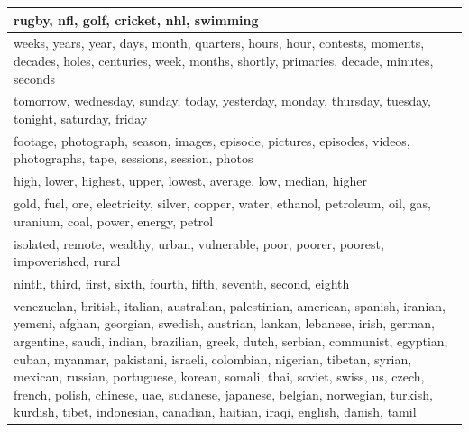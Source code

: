 \documentclass{kais}
\begin{document}
\begin{table}
\begin{center}
\begin{tabular*}{\textwidth}{p{\textwidth-0.3cm}}
rugby, nfl, golf, cricket, nhl, swimming\\
\hline
weeks, years, year, days, month, quarters, hours, hour, contests, moments, decades, 
holes, centuries, week, months, shortly, primaries, decade, minutes, seconds\\
\hline
tomorrow, wednesday, sunday, today, yesterday, monday, thursday, tuesday, tonight, 
saturday, friday\\
\hline
footage, photograph, season, images, episode, pictures, episodes, videos, photographs, 
tape, sessions, session, photos\\
\hline
high, lower, highest, upper, lowest, average, low, median, higher\\
\hline
gold, fuel, ore, electricity, silver, copper, water, ethanol, petroleum, oil, gas, uranium, 
coal, power, energy, petrol\\
\hline
isolated, remote, wealthy, urban, vulnerable, poor, poorer, poorest, impoverished, rural\\
\hline
ninth, third, first, sixth, fourth, fifth, seventh, second, eighth\\
\hline
venezuelan, british, italian, australian, palestinian, american, spanish, iranian, yemeni, afghan, 
georgian, swedish, austrian, lankan, lebanese, irish, german, argentine, saudi, indian, brazilian, 
greek, dutch, serbian, communist, egyptian, cuban, myanmar, pakistani, israeli, colombian, 
nigerian, tibetan, syrian, mexican, russian, portuguese, korean, somali, thai, soviet, swiss, us, 
czech, french, polish, chinese, uae, sudanese, japanese, belgian, norwegian, turkish, kurdish, 
tibet, indonesian, canadian, haitian, iraqi, english, danish, tamil\\
\hline
\end{tabular*}
\end{center}
\label{table:selected-clusters}
\end{table}
\end{document}
